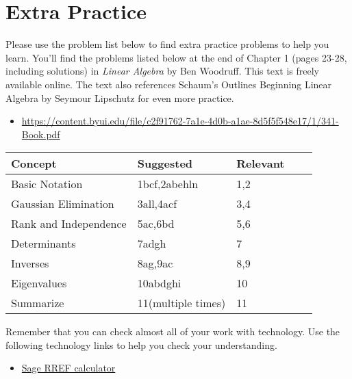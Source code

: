 
\section*{Extra Practice}

Please use the problem list below to find extra practice problems to help you learn.  You'll find the problems listed below  at the end of Chapter 1 (pages 23-28, including solutions) in {\it Linear Algebra} by Ben Woodruff. This text is freely available online. The text also references Schaum's Outlines Beginning Linear Algebra by Seymour Lipschutz for even more practice. 
\begin{itemize}
 \item \href{https://content.byui.edu/file/c2f91762-7a1e-4d0b-a1ae-8d5f5f548e17/1/341-Book.pdf}{https://content.byui.edu/file/c2f91762-7a1e-4d0b-a1ae-8d5f5f548e17/1/341-Book.pdf}
\end{itemize}
\begin{center}
\begin{tabular}{|l|l|l|l|l|}
\hline
Concept& Suggested&Relevant\\ \hline
Basic Notation&1bcf,2abehln&1,2\\ \hline
Gaussian Elimination&3all,4acf&3,4\\ \hline
Rank and Independence&5ac,6bd&5,6\\ \hline
Determinants&7adgh&7\\ \hline
Inverses&8ag,9ac&8,9\\ \hline
Eigenvalues&10abdghi&10\\ \hline
Summarize&11(multiple times)&11\\ \hline
\end{tabular}
\end{center}


Remember that you can check almost all of your work with technology.  Use the following technology links to help you check your understanding.
\begin{itemize}
 \item \href{\urlrref}{Sage RREF calculator}
\end{itemize}








\restoregeometry
